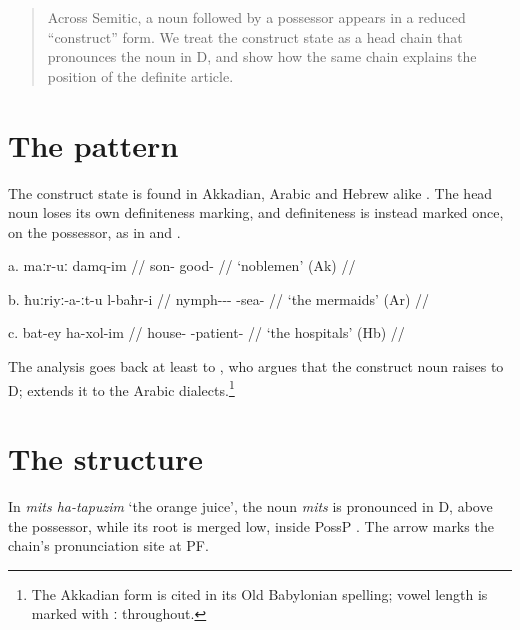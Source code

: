 
\begin{abstract}
Across Semitic, a noun followed by a possessor appears in a reduced ``construct'' form. We treat the construct state as a head chain that pronounces the noun in D, and show how the same chain explains the position of the definite article.
\end{abstract}
\label{ch:construct}

\section{The pattern}\label{sec:construct-pattern}

The construct state is found in Akkadian, Arabic and Hebrew alike \Next. The head noun loses its own definiteness marking, and definiteness is instead marked once, on the possessor, as in  and .

{\onehalfspacing
{}
\begin{paracol}{3}

\ex a. \begingl {}
\gla maːr-uː damq-im //
\glb son- good- //
\glft `noblemen' (Ak) // \endgl

\switchcolumn

\vspace{0.8mm}
b. \begingl
\gla ħuːriyː-a-ːt-u l-baħr-i //
\glb nymph--- -sea- //
\glft `the mermaids' (Ar) // \endgl

\switchcolumn

\vspace{0.8mm} c. \begingl
    \gla bat-ey ha-xol-im //
    \glb house- -patient- //
    \glft `the hospitals' (Hb) // \endgl \xe

\end{paracol}}

The analysis goes back at least to \citet{ritter1991}, who argues that the construct noun raises to D; \citet{benmamoun2000} extends it to the Arabic dialects.\footnote{The Akkadian form is cited in its Old Babylonian spelling; vowel length is marked with ː throughout.}

\section{The structure}\label{sec:construct-tree}

In \textit{mits ha-tapuzim} `the orange juice', the noun \textit{mits} is pronounced in D, above the possessor, while its root is merged low, inside PossP \Next. The arrow marks the chain's pronunciation site at PF.

